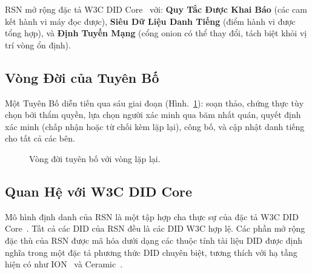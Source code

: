 \documentclass[11pt,a4paper,twocolumn]{article}
\begin{document}
RSN mở rộng đặc tả W3C DID Core~\cite{did2022} với: \textbf{Quy Tắc Được Khai Báo} (các cam kết hành vi máy đọc được), \textbf{Siêu Dữ Liệu Danh Tiếng} (điểm hành vi được tổng hợp), và \textbf{Định Tuyến Mạng} (cổng onion có thể thay đổi, tách biệt khỏi vị trí vòng ổn định).

\subsection{Vòng Đời của Tuyên Bố}

Một Tuyên Bố diễn tiến qua sáu giai đoạn (Hình.~\ref{fig:lifecycle}): soạn thảo, chứng thực tùy chọn bởi thẩm quyền, lựa chọn người xác minh qua băm nhất quán, quyết định xác minh (chấp nhận hoặc từ chối kèm lặp lại), công bố, và cập nhật danh tiếng cho tất cả các bên.

\begin{figure}[ht]
\centering
{}
\caption{Vòng đời tuyên bố với vòng lặp lại.}
\label{fig:lifecycle}
\end{figure}

\subsection{Quan Hệ với W3C DID Core}

Mô hình định danh của RSN là một tập hợp cha thực sự của đặc tả W3C DID Core~\cite{did2022}. Tất cả các DID của RSN đều là các DID W3C hợp lệ. Các phần mở rộng đặc thù của RSN được mã hóa dưới dạng các thuộc tính tài liệu DID được định nghĩa trong một đặc tả phương thức DID chuyên biệt, tương thích với hạ tầng hiện có như ION~\cite{buchner2021} và Ceramic~\cite{ceramic2023}.
\end{document}
